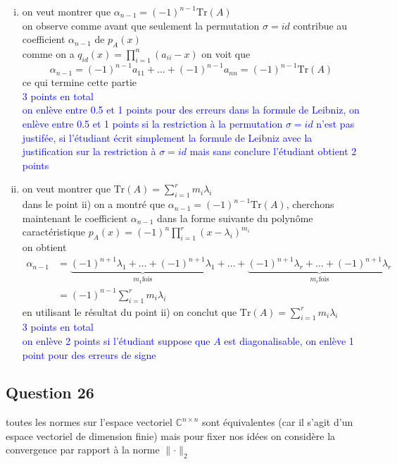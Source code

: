 \documentclass[11pt, a4paper, oneside]{article}
\begin{document}
\begin{enumerate}[i)]
\item 
on veut montrer que $\alpha_{n-1} = (-1)^{n-1}\text{Tr}(A)$ \\
{\tiny on observe comme avant que} seulement la permutation $\sigma = id$ contribue au coefficient $\alpha_{n-1}$ de $p_A(x)$ \\
comme on a $q_{id}(x) = \prod_{i=1}^n(a_{ii}-x)$ on voit que $$\alpha_{n-1} = (-1)^{n-1}a_{11} + \ldots + (-1)^{n-1}a_{nn} = (-1)^{n-1}\text{Tr}(A)$$
ce qui termine cette partie \\
\textcolor{blue}{3 points en total \\ on enlève entre 0.5 et 1 points pour des erreurs dans la formule de Leibniz, on enlève entre 0.5 et 1 points si la restriction à la permutation $\sigma = id$ n'est pas justifée, si l'étudiant écrit simplement la formule de Leibniz avec la justification sur la restriction à $\sigma = id$ mais sans conclure l'étudiant obtient 2 points}

\item 
on veut montrer que $\text{Tr}(A) = \sum_{i=1}^r m_i\lambda_i$ \\
{\tiny dans le point ii) on a montré que $\alpha_{n-1} = (-1)^{n-1}\text{Tr}(A)$,} cherchons maintenant le coefficient $\alpha_{n-1}$ dans la forme suivante du polynôme caractéristique $p_A(x) = (-1)^n \prod_{i=1}^r (x-\lambda_i)^{m_i}$ \\
on obtient
\begin{align*}
\alpha_{n-1} &= \underbrace{(-1)^{n+1}\lambda_1 + \ldots + (-1)^{n+1}\lambda_1}_{m_1 \text{fois}} + \ldots + \underbrace{(-1)^{n+1}\lambda_r + \ldots + (-1)^{n+1}\lambda_r}_{m_r \text{fois}} \\
&= (-1)^{n-1} \sum_{i=1}^r m_i\lambda_i
\end{align*}
en utilisant le résultat du point ii) on conclut que $\text{Tr}(A) = \sum_{i=1}^r m_i\lambda_i$ \\ 
\textcolor{blue}{3 points en total \\ on enlève 2 points si l'étudiant suppose que $A$ est diagonalisable, on enlève 1 point pour des erreurs de signe} 
\end{enumerate}


\subsection*{Question 26}
{\tiny toutes les normes sur l'espace vectoriel $\mathbb{C}^{n \times n}$ sont équivalentes (car il s'agit d'un espace vectoriel de dimension finie) mais pour fixer nos idées on considère la convergence par rapport à la norme $\lVert \cdot \rVert_2$}
\end{document}
